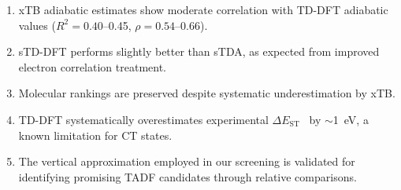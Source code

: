 \documentclass[journal=cmatex,manuscript=suppinfo,
keywords=true]{achemso}
\newcommand{\deltaest}{$\Delta E_{\text{ST}}$}
\begin{document}
\begin{enumerate}
\item xTB adiabatic estimates show moderate correlation with TD-DFT adiabatic values ($R^2 = 0.40$--0.45, $\rho = 0.54$--0.66).
\item sTD-DFT performs slightly better than sTDA, as expected from improved electron correlation treatment.
\item Molecular rankings are preserved despite systematic underestimation by xTB.
\item TD-DFT systematically overestimates experimental \deltaest~ by $\sim$1~eV, a known limitation for CT states.
\item The vertical approximation employed in our screening is validated for identifying promising TADF candidates through relative comparisons.
\end{enumerate}


\end{document}
